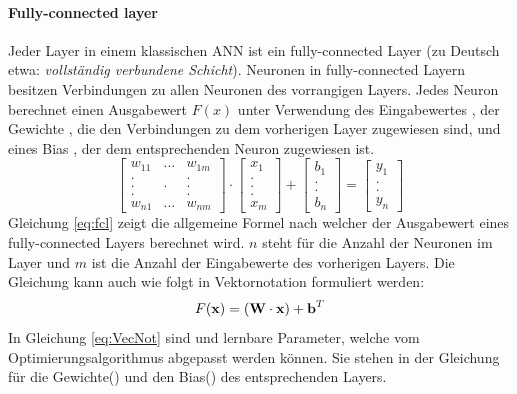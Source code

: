\paragraph{Fully-connected layer}
Jeder Layer in einem klassischen ANN ist ein fully-connected Layer (zu Deutsch etwa: \textit{vollständig verbundene Schicht}). Neuronen in fully-connected Layern besitzen Verbindungen zu allen Neuronen des vorrangigen Layers. Jedes Neuron berechnet einen Ausgabewert $F(x)$ unter Verwendung des Eingabewertes , der Gewichte , die den Verbindungen zu dem vorherigen Layer zugewiesen sind, und eines Bias , der dem entsprechenden Neuron zugewiesen ist. 
\begin{equation}
\label{eq:fcl}
\begin{bmatrix}
w_{11} & ... & w_{1m}\\
. &  & .\\
. & . & .\\
. &  & .\\
w_{n1} & ... & w_{nm} 
\end{bmatrix} \cdot
\begin{bmatrix}
x_1\\
.\\
.\\
.\\
x_m
\end{bmatrix} + 
\begin{bmatrix}
b_1\\
.\\
.\\
b_n
\end{bmatrix} = 
\begin{bmatrix}
y_1\\
.\\
.\\
y_n
\end{bmatrix}
\end{equation}
Gleichung \ref{eq:fcl} zeigt die allgemeine Formel nach welcher der Ausgabewert eines fully-connected Layers berechnet wird. $n$ steht für die Anzahl der Neuronen im Layer und $m$ ist die Anzahl der Eingabewerte des vorherigen Layers. Die Gleichung kann auch wie folgt in Vektornotation formuliert werden: 
\begin{equation}
\label{eq:VecNot}
F(\vect{x}) = (\mat{W} \cdot \vect{x}) + \vect{b}^T
\end{equation} 
In Gleichung \ref{eq:VecNot} sind  und  lernbare Parameter, welche vom Optimierungsalgorithmus abgepasst werden k\"onnen. Sie stehen in der Gleichung f\"ur die Gewichte() und den Bias() des entsprechenden Layers.

